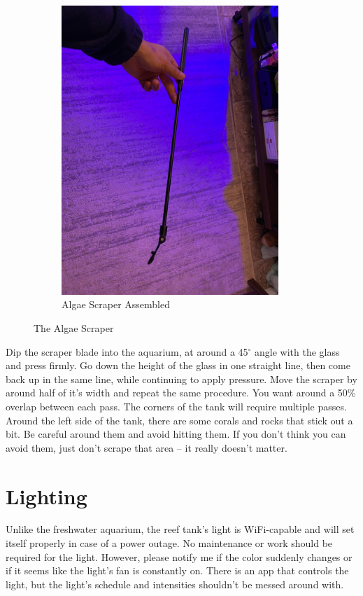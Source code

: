 \documentclass{report}
\begin{document}
\begin{figure}[H]
\begin{subfigure}{0.5\textwidth}
        \includegraphics[width=0.9\textwidth]{Scraper.jpg}
        \caption{Algae Scraper Assembled}
    \end{subfigure}
    \caption{The Algae Scraper}
\end{figure}

Dip the scraper blade into the aquarium, at around a 45$^{\circ}$ angle with the glass and press firmly. Go down the height 
of the glass in one straight line, then come back up in the same line, while continuing to apply pressure. Move the scraper 
by around half of it's width and repeat the same procedure. You want around a 50\% overlap between each pass. The corners of 
the tank will require multiple passes. Around the left side of the tank, there are some corals and rocks that stick out a 
bit. Be careful around them and avoid hitting them. If you don't think you can avoid them, just don't scrape that area -- it 
really doesn't matter.

\section{Lighting}
Unlike the freshwater aquarium, the reef tank's light is WiFi-capable and will set itself properly in case of a power outage. 
No maintenance or work should be required for the light. However, please notify me if the color suddenly changes or if it 
seems like the light's fan is constantly on. There is an app that controls the light, but the light's schedule and 
intensities shouldn't be messed around with. 
\end{document}
